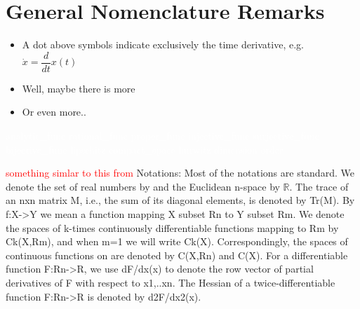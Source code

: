 \section*{General Nomenclature Remarks}
\vspace{0.1cm}
\begin{itemize}
\item A dot above symbols indicate exclusively the time derivative, e.g. $\dot{x} = \dfrac{d}{dt}x(t)$
\item Well, maybe there is more
\item Or even more..
\end{itemize}

\textcolor{white}{\gls{analytic_func} \gls{rational_func} \gls{proper_func} \gls{injective_func} \gls{surjective_func} \gls{bijective_func} \gls{lipschitz} \gls{compact_space} \gls{hurwitz} \gls{dimension} \gls{order}}


\textcolor{red}{something simlar to this from \citep{bib:barrier_prajna}}
Notations: Most of the notations are standard. We denote
the set of real numbers by and the Euclidean n-space by $\mathbb{R}$.
The trace of an nxn matrix M, i.e., the sum of its diagonal elements,
is denoted by Tr(M). By f:X->Y we mean a function
mapping X subset Rn to Y subset Rm. We denote the spaces of
k-times continuously differentiable functions mapping
to Rm by Ck(X,Rm), and when m=1 we will write Ck(X).
Correspondingly, the spaces of continuous functions on are
denoted by C(X,Rn) and C(X). For a differentiable function
F:Rn->R, we use dF/dx(x) to denote the row vector
of partial derivatives of F with respect to x1,..xn. The Hessian
of a twice-differentiable function F:Rn->R is denoted
by d2F/dx2(x).